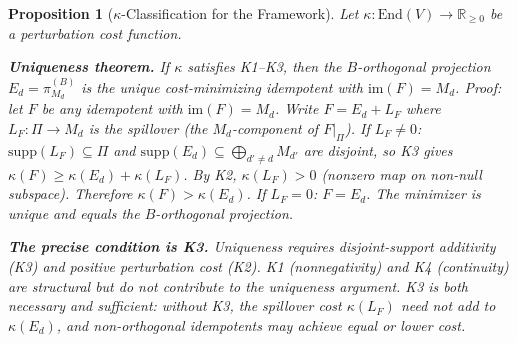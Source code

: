 \documentclass[11pt,a4paper]{article}
\newtheorem{proposition}[theorem]{Proposition}
\theoremstyle{definition}
\newcommand{\End}{\mathrm{End}}
\newcommand{\im}{\mathrm{im}}
\begin{document}
\begin{proposition}[$\kappa$-Classification for the Framework]\label{prop:kappa_class}
Let $\kappa: \End(V) \to \mathbb{R}_{\ge 0}$ be a perturbation cost function.

\smallskip\noindent\textbf{Uniqueness theorem.}  If $\kappa$ satisfies K1--K3, then the $B$-orthogonal projection $E_d = \pi_{M_d}^{(B)}$ is the \emph{unique} cost-minimizing idempotent with $\im(F) = M_d$.  \textit{Proof:} let $F$ be any idempotent with $\im(F) = M_d$.  Write $F = E_d + L_F$ where $L_F: \Pi \to M_d$ is the spillover (the $M_d$-component of $F|_\Pi$).  If $L_F \ne 0$: $\mathrm{supp}(L_F) \subseteq \Pi$ and $\mathrm{supp}(E_d) \subseteq \bigoplus_{d' \ne d} M_{d'}$ are disjoint, so K3 gives $\kappa(F) \ge \kappa(E_d) + \kappa(L_F)$.  By K2, $\kappa(L_F) > 0$ (nonzero map on non-null subspace).  Therefore $\kappa(F) > \kappa(E_d)$.  If $L_F = 0$: $F = E_d$.  The minimizer is unique and equals the $B$-orthogonal projection.

\smallskip\noindent\textbf{The precise condition is K3.}  Uniqueness requires disjoint-support additivity (K3) and positive perturbation cost (K2).  K1 (nonnegativity) and K4 (continuity) are structural but do not contribute to the uniqueness argument.  K3 is both necessary and sufficient: without K3, the spillover cost $\kappa(L_F)$ need not add to $\kappa(E_d)$, and non-orthogonal idempotents may achieve equal or lower cost.


\end{proposition}
\end{document}
